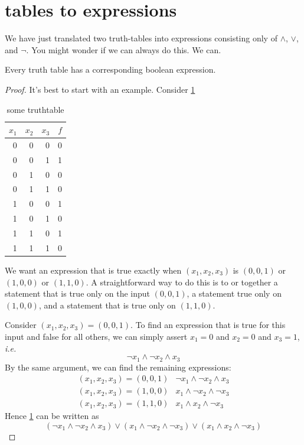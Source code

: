 \documentclass{scrbook}
\begin{document}
\section[Tables to Expressions]{tables to expressions}
We have just translated two truth-tables into expressions consisting only of $\wedge$, $\vee$, and $\neg$. You might wonder if we can always do this. We can. 
\begin{theorem}[completeness]
  Every truth table has a corresponding boolean expression.
\end{theorem}
\begin{proof}
  It's best to start with an example. Consider \cref{tt:complete}
  \begin{table}[h!]
    \centering
  \caption{some truthtable}\label{tt:complete}
\begin{tabular}{rrrr}
$x_1$ & $x_2$ & $x_3$ & $f$ \\
\hline
0 & 0 & 0 & 0 \\
\rowcolor{LightCyan} 0 & 0 & 1 & 1 \\
0 & 1 & 0 & 0 \\
0 & 1 & 1 & 0 \\
\rowcolor{LightCyan} 1 & 0 & 0 & 1 \\
1 & 0 & 1 & 0 \\
\rowcolor{LightCyan} 1 & 1 & 0 & 1 \\
1 & 1 & 1 & 0 
\end{tabular}
\end{table}
We want an expression that is true exactly when $(x_1,x_2,x_3)$ is $(0,0,1)$ or $(1,0,0)$ or $(1,1,0)$. A straightforward way to do this is to or together a statement that is true only on the input $(0,0,1)$, a statement true only on $(1,0,0)$, and a statement that is true only on $(1,1,0)$. 

Consider $(x_1,x_2,x_3)=(0,0,1)$. To find an expression that is true for this input and false for all others, we can simply assert $x_1=0$ and $x_2=0$ and $x_3=1$, \emph{i.e.}
\[
\neg x_1\wedge \neg x_2 \wedge x_3
\]
By the same argument, we can find the remaining expressions:
\[
\begin{matrix}
 (x_1,x_2,x_3)=(0,0,1) & \neg x_1 \wedge \neg x_2 \wedge x_3 \\
 (x_1,x_2,x_3)=(1,0,0) & x_1 \wedge \neg x_2 \wedge \neg x_3 \\
 (x_1,x_2,x_3)=(1,1,0) & x_1 \wedge x_2 \wedge \neg x_3 
\end{matrix}
\]
Hence \cref{tt:complete} can be written as 
\[
(\neg x_1 \wedge \neg x_2 \wedge x_3 ) \vee (x_1 \wedge \neg x_2 \wedge \neg x_3) \vee  (x_1 \wedge x_2 \wedge \neg x_3)
\]


\end{proof}
\end{document}
